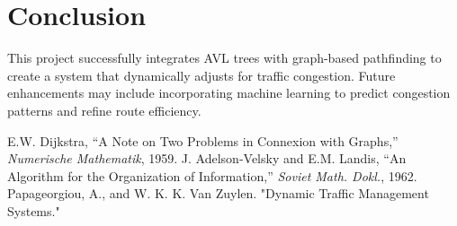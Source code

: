 \documentclass{article}
\begin{document}
\section{Conclusion}
This project successfully integrates AVL trees with graph-based pathfinding to create a system that dynamically adjusts for traffic congestion. Future enhancements may include incorporating machine learning to predict congestion patterns and refine route efficiency.

\begin{thebibliography}{9}
E.W. Dijkstra, “A Note on Two Problems in Connexion with Graphs,” \textit{Numerische Mathematik}, 1959.
J. Adelson-Velsky and E.M. Landis, “An Algorithm for the Organization of Information,” \textit{Soviet Math. Dokl.}, 1962.
Papageorgiou, A., and W. K. K. Van Zuylen. "Dynamic Traffic Management Systems."
\end{thebibliography}
\end{document}
